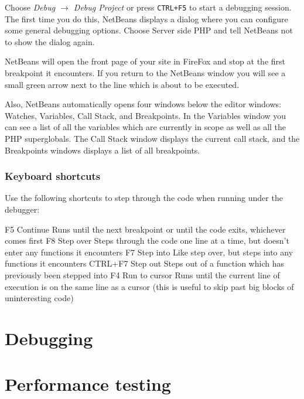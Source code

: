 \documentclass[final,ebook,10pt,twoside,openright]{memoir}
\begin{document}
Choose \emph{Debug $\rightarrow$ Debug Project} or press \verb!CTRL+F5! to start a debugging session. The first time you do this, NetBeans displays a dialog where you can configure some general debugging options. Choose Server side PHP and tell NetBeans not to show the dialog again.

NetBeans will open the front page of your site in FireFox and stop at the first breakpoint it encounters. If you return to the NetBeans window you will see a small green arrow next to the line which is about to be executed.

Also, NetBeans automatically opens four windows below the editor windows: Watches, Variables, Call Stack, and Breakpoints. In the Variables window you can see a list of all the variables which are currently in scope as well as all the PHP superglobals. The Call Stack window displays the current call stack, and the Breakpoints windows displays a list of all breakpoints.

\subsection{Keyboard shortcuts}

Use the following shortcuts to step through the code when running under the debugger:

F5 	Continue 	Runs until the next breakpoint or until the code exits, whichever comes first
F8 	Step over 	Steps through the code one line at a time, but doesn’t enter any functions it encounters
F7 	Step into 	Like step over, but steps into any functions it encounters
CTRL+F7 	Step out 	Steps out of a function which has previously been stepped into
F4 	Run to cursor 	Runs until the current line of execution is on the same line as a cursor (this is useful to skip past big blocks of uninteresting code)


\chapter{Debugging} %
\label{cha:Debugging}


\chapter{Performance testing} %
\label{cha:Performance testing}
\end{document}
